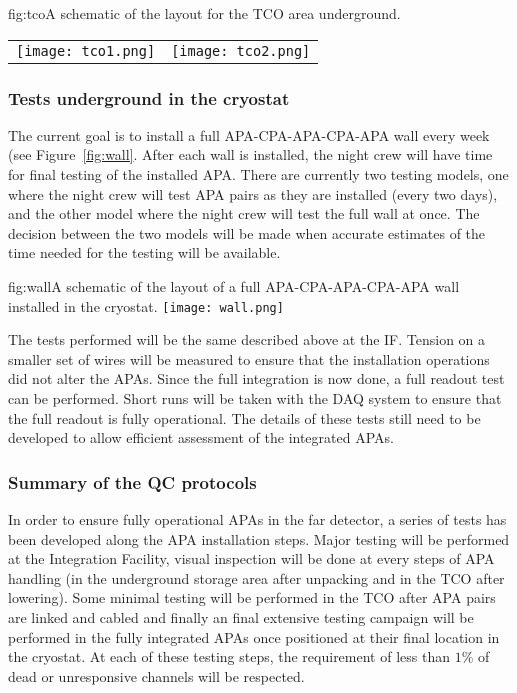 \begin{dunefigure}{fig:tco}{A schematic of the layout for the TCO area underground.}
\begin{tabular}{cc}
\texttt{[image: tco1.png]} &
\texttt{[image: tco2.png]}
\end{tabular}
\end{dunefigure}

\subsubsection{Tests underground in the cryostat}

The current goal is to install a full APA-CPA-APA-CPA-APA wall every week (see Figure~\ref{fig:wall}. After each wall is installed, the night crew will have time for final testing of the installed APA. There are currently two testing models, one where the night crew will test APA pairs as they are installed (every two days), and the other model where the night crew will test the full wall at once. The decision between the two models will be made when accurate estimates of the time needed for the testing will be available.

\begin{dunefigure}{fig:wall}{A schematic of the layout of a full APA-CPA-APA-CPA-APA wall installed in the cryostat.}
\texttt{[image: wall.png]}
\end{dunefigure}

The tests performed will be the same described above at the IF. Tension on a smaller set of wires will be measured to ensure that the installation operations did not alter the APAs. Since the full integration is now done, a full readout test can be performed. Short runs will be taken with the DAQ system to ensure that the full readout is fully operational. The details of these tests still need to be developed to allow efficient assessment of the integrated APAs.

\subsubsection{Summary of the QC protocols}

In order to ensure fully operational APAs in the far detector, a series of tests has been developed along the APA installation steps. Major testing will be performed at the Integration Facility, visual inspection will be done at every steps of APA handling (in the underground storage area after unpacking and in the TCO after lowering). Some minimal testing will be performed in the TCO after APA pairs are linked and cabled and finally an final extensive testing campaign will be performed in the fully integrated APAs once positioned at their final location in the cryostat. At each of these testing steps, the requirement of less than $1\%$ of dead or unresponsive channels will be respected.

